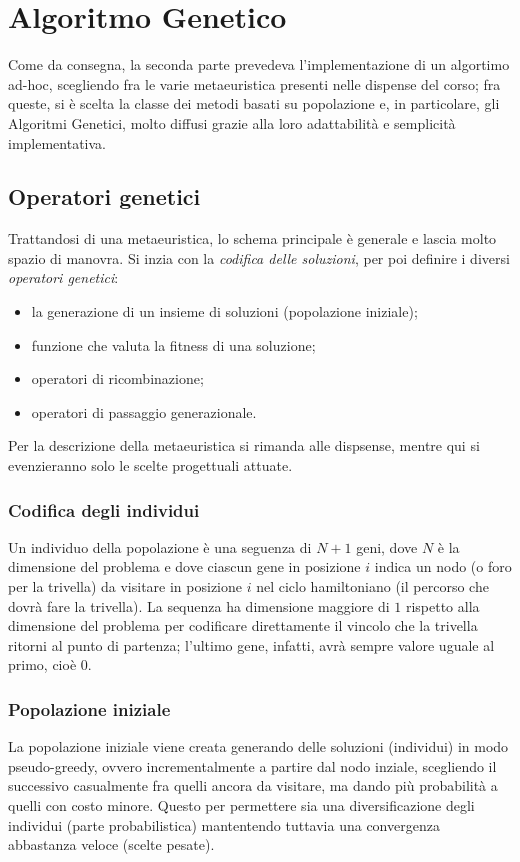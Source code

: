 
\section{Algoritmo Genetico}\label{sec:GA}
Come da consegna, la seconda parte prevedeva l'implementazione di un algortimo ad-hoc, scegliendo fra le varie
metaeuristica presenti nelle dispense del corso;
fra queste, si è scelta la classe dei metodi basati su popolazione e, in particolare, gli Algoritmi Genetici,
molto diffusi grazie alla loro adattabilità e semplicità implementativa.
\subsection{Operatori genetici}\label{subsec:operatori-genetici}
Trattandosi di una metaeuristica, lo schema principale è generale e lascia molto spazio di manovra.
Si inzia con la \textit{codifica delle soluzioni}, per poi definire i diversi \textit{operatori genetici}:
\begin{itemize}
	\item la generazione di un insieme di soluzioni (popolazione iniziale);
	\item funzione che valuta la fitness di una soluzione;
	\item operatori di ricombinazione;
	\item operatori di passaggio generazionale.
\end{itemize}
Per la descrizione della metaeuristica si rimanda alle dispsense, mentre qui si evenzieranno
solo le scelte progettuali attuate.
\subsubsection{Codifica degli individui}\label{subsubsec:codifica-individui}
Un individuo della popolazione è una seguenza di $N+1$ geni, dove $N$ è la dimensione del problema e
dove ciascun gene in posizione $i$ indica un nodo (o foro per la trivella) da visitare in posizione $i$
nel ciclo hamiltoniano (il percorso che dovrà fare la trivella).
La sequenza ha dimensione maggiore di $1$ rispetto alla dimensione del problema per codificare direttamente
il vincolo che la trivella ritorni al punto di partenza; l'ultimo gene, infatti, avrà sempre valore uguale
al primo, cioè $0$.
\subsubsection{Popolazione iniziale}\label{subsubsec:popolazione-inziale}
La popolazione iniziale viene creata generando delle soluzioni (individui) in modo pseudo-greedy, ovvero
incrementalmente a partire dal nodo inziale, scegliendo il successivo casualmente fra quelli ancora da visitare,
ma dando più probabilità a quelli con costo minore.
Questo per permettere sia una diversificazione degli individui (parte probabilistica) mantentendo tuttavia
una convergenza abbastanza veloce (scelte pesate).

